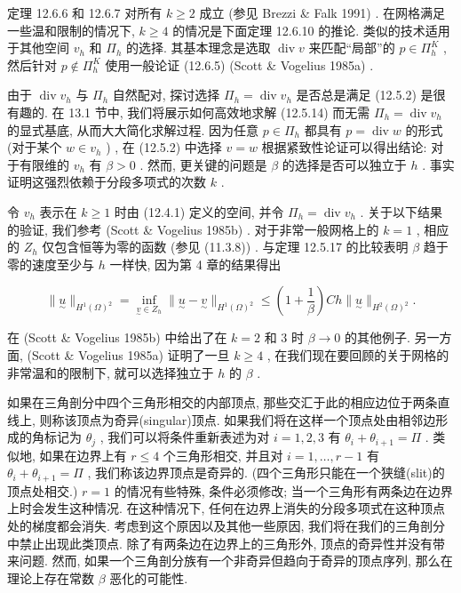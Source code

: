 定理 12.6.6 和 12.6.7 对所有 $k \geq 2$ 成立 (参见 Brezzi \& Falk 1991) . 在网格满足一些温和限制的情况下, $k \geq 4$ 的情况是下面定理 12.6.10 的推论. 类似的技术适用于其他空间 $v_{h}$ 和 $\varPi_{h}$ 的选择. 其基本理念是选取 $\operatorname{div}v$ 来匹配“局部”的 $p \in \varPi_{h}^{K}$ , 然后针对 $p \notin \varPi_{h}^{K}$ 使用一般论证 (12.6.5) (Scott \& Vogelius 1985a) .

由于 $\operatorname{div}v_{h}$ 与 $\varPi_{h}$ 自然配对, 探讨选择 $\varPi_{h} = \operatorname{div}v_{h}$ 是否总是满足 (12.5.2) 是很有趣的. 在 13.1 节中, 我们将展示如何高效地求解 (12.5.14) 而无需 $\varPi_{h} = \operatorname{div}v_{h}$ 的显式基底, 从而大大简化求解过程. 因为任意 $p \in \varPi_{h}$ 都具有 $p = \operatorname{div}w$ 的形式 (对于某个 $w \in v_{h}$ ) , 在 (12.5.2) 中选择 $v = w$ 根据紧致性论证可以得出结论: 对于有限维的 $v_{h}$ 有 $\beta > 0$ . 然而, 更关键的问题是 $\beta$ 的选择是否可以独立于 $h$ . 事实证明这强烈依赖于分段多项式的次数 $k$ .

令 $v_{h}$ 表示在 $k \geq 1$ 时由 (12.4.1) 定义的空间, 并令 $\varPi_{h} = \operatorname{div}v_{h}$ . 关于以下结果的验证, 我们参考 (Scott \& Vogelius 1985b) . 对于非常一般网格上的 $k = 1$ , 相应的 $Z_{h}$ 仅包含恒等为零的函数 (参见 (11.3.8)) . 与定理 12.5.17 的比较表明 $\beta$ 趋于零的速度至少与 $h$ 一样快, 因为第 4 章的结果得出

$$
\|\underset{\sim}{u}\|_{H^{1}(\Omega)^{2}} = \inf_{\underset{\sim}{v} \in Z_{h}} \|\underset{\sim}{u} - \underset{\sim}{v}\|_{H^{1}(\Omega)^{2}} \leq \left( 1 + \frac{1}{\beta} \right) Ch \|\underset{\sim}{u}\|_{H^{2}(\Omega)^{2}}.
$$

在 (Scott \& Vogelius 1985b) 中给出了在 $k = 2$ 和 $3$ 时 $\beta \rightarrow 0$ 的其他例子. 另一方面, (Scott \& Vogelius 1985a) 证明了一旦 $k \geq 4$ , 在我们现在要回顾的关于网格的非常温和的限制下, 就可以选择独立于 $h$ 的 $\beta$ .

如果在三角剖分中四个三角形相交的内部顶点, 那些交汇于此的相应边位于两条直线上, 则称该顶点为奇异(singular)顶点. 如果我们将在这样一个顶点处由相邻边形成的角标记为 $\theta_{j}$ , 我们可以将条件重新表述为对 $i = 1,2,3$ 有 $\theta_{i} + \theta_{i + 1} = \varPi$ . 类似地, 如果在边界上有 $r \leq 4$ 个三角形相交, 并且对 $i = 1,\ldots ,r - 1$ 有 $\theta_{i} + \theta_{i + 1} = \varPi$ , 我们称该边界顶点是奇异的. (四个三角形只能在一个狭缝(slit)的顶点处相交.) $r = 1$ 的情况有些特殊, 条件必须修改; 当一个三角形有两条边在边界上时会发生这种情况. 在这种情况下, 任何在边界上消失的分段多项式在这种顶点处的梯度都会消失. 考虑到这个原因以及其他一些原因, 我们将在我们的三角剖分中禁止出现此类顶点. 除了有两条边在边界上的三角形外, 顶点的奇异性并没有带来问题. 然而, 如果一个三角剖分族有一个非奇异但趋向于奇异的顶点序列, 那么在理论上存在常数 $\beta$ 恶化的可能性.

